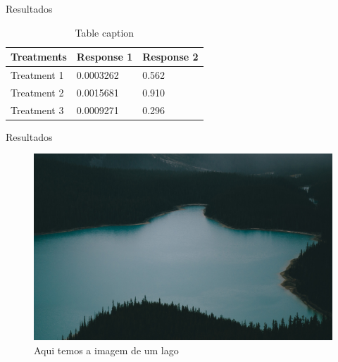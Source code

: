 \begin{frame}{Resultados}
\begin{table}
\begin{tabular}{l l l}
\toprule
\textbf{Treatments} & \textbf{Response 1} & \textbf{Response 2}\\
\midrule
Treatment 1 & 0.0003262 & 0.562 \\
Treatment 2 & 0.0015681 & 0.910 \\
Treatment 3 & 0.0009271 & 0.296 \\
\bottomrule
\end{tabular}
\caption{Table caption}
\end{table}
\end{frame}

\begin{frame}{Resultados}
    
\begin{figure}
    \centering
    \includegraphics[width=.7\textwidth]{img/river.jpg}
    \caption{Aqui temos a imagem de um lago}
\end{figure}

\end{frame}